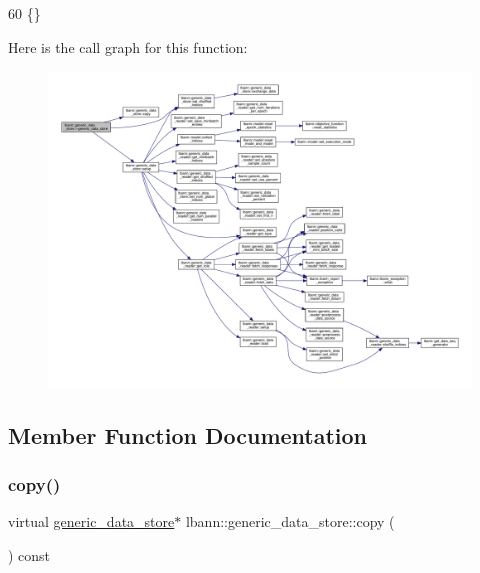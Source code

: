 \begin{DoxyCode}
60 \{\}
\end{DoxyCode}
Here is the call graph for this function\+:\nopagebreak
\begin{figure}[H]
\begin{center}
\leavevmode
\includegraphics[width=350pt]{classlbann_1_1generic__data__store_ac8f202a6aa5a3c5007a9d7d53c687851_cgraph}
\end{center}
\end{figure}


\subsection{Member Function Documentation}
\mbox{\label{classlbann_1_1generic__data__store_ae06e089790aa023b839be508a3c020c6}} 
\subsubsection{\texorpdfstring{copy()}{copy()}}
{\footnotesize\ttfamily virtual \hyperlink{classlbann_1_1generic__data__store}{generic\+\_\+data\+\_\+store}$\ast$ lbann\+::generic\+\_\+data\+\_\+store\+::copy (\begin{DoxyParamCaption}{ }\end{DoxyParamCaption}) const\hspace{0.3cm}{\ttfamily [pure virtual]}}



